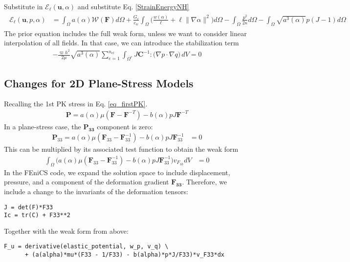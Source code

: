 \documentclass[12pt,3p]{article}
\numberwithin{equation}{section}
\begin{document}
Substitute in $\mathcal{E}_{\ell} (\boldsymbol{u}, \alpha )$ and substitute Eq. \ref{StrainEnergyNH}
\begin{align*}
\begin{split}
\mathcal{E}_{\ell}\left(\boldsymbol{u}, p, \alpha\right) &= \int_{\Omega} a(\alpha) \mathcal{W}(\mathbf{F}) d \Omega+\frac{G_{c}}{c_{w}} \int_{\Omega} \bigg(\frac{w(\alpha)}{\ell}+\ell\|\nabla \alpha\|^{2} \bigg) d \Omega- \int_{\Omega} \frac{p^{2}}{2 \kappa} d \Omega - \int_{\Omega} \sqrt{a^{3}(\alpha)} p(J-1) d \Omega 
\end{split}
\end{align*}
The prior equation includes the full weak form, unless we want to consider linear interpolation of all fields. In that case, we can introduce the stabilization term 
\begin{align*}
- \frac{\varpi h^2}{2\mu} \sqrt{a^3(\alpha)} \sum_{e=1}^{n_{el}}\int_{\Omega^{e}} J \mathbf{C}^{-1} : \big( \nabla p \cdot \nabla q \big) \,dV = 0 
\end{align*}

\subsection{Changes for 2D Plane-Stress Models}
Recalling the 1st PK stress in Eq. \ref{eq_firstPK}.
\begin{align*}
\mathbf{P} = a (\alpha) \mu (\mathbf{F} - \mathbf{F}^{-T}) - b (\alpha) p J \mathbf{F}^{-T}
\end{align*}
In a plane-stress case, the $\mathbf{P_{33}}$ component is zero:
\begin{align*}
\mathbf{P}_{33} = a (\alpha) \mu (\mathbf{F}_{33} - \mathbf{F}^{-1}_{33}) - b (\alpha) p J \mathbf{F}^{-1}_{33} &= 0 
\end{align*}
This can be multiplied by its associated test function to obtain the weak form 
\begin{align*}
\int_{\Omega} \bigg(a (\alpha) \mu (\mathbf{F}_{33} - \mathbf{F}^{-1}_{33}) - b (\alpha) p J \mathbf{F}^{-1}_{33} \bigg) v_{F_{33}} dV &= 0
\end{align*}
In the FEniCS code, we expand the solution space to include displacement, pressure, and a component of the deformation gradient $\mathbf{F_{33}}$. Therefore, we include a change to the invariants of the deformation tensors: 
\begin{lstlisting}
J = det(F)*F33
Ic = tr(C) + F33**2
\end{lstlisting}
Together with the weak form from above: 
\begin{lstlisting}
F_u = derivative(elastic_potential, w_p, v_q) \
      + (a(alpha)*mu*(F33 - 1/F33) - b(alpha)*p*J/F33)*v_F33*dx
\end{lstlisting}
\end{document}
